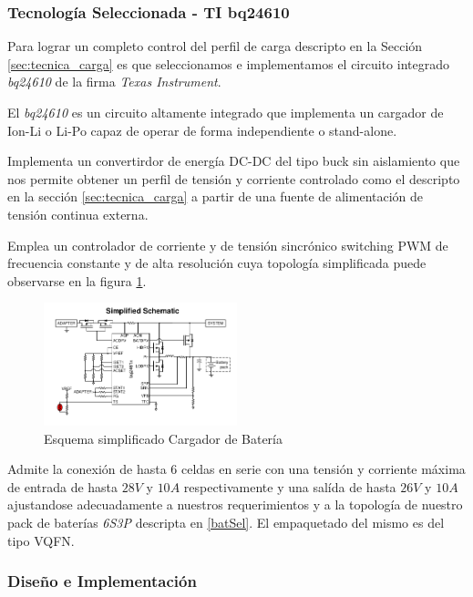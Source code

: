 \documentclass[10pt, a4paper]{article}
\begin{document}
\subsubsection{Tecnología Seleccionada - TI bq24610}

Para lograr un completo control del perfil de carga descripto en la Sección
\ref{sec:tecnica_carga}  es que seleccionamos e implementamos el circuito
integrado \emph{bq24610} de la firma \emph{Texas Instrument}.

El \emph{bq24610} es un circuito altamente integrado que implementa un cargador
de \acrfull{Ion-Li} o \acrfull{Li-Po} capaz de operar de forma independiente o
stand-alone.

Implementa un convertirdor de energía DC-DC del tipo buck sin aislamiento que
nos permite obtener un perfil de tensión y corriente controlado como el
descripto en la sección \ref{sec:tecnica_carga} a partir de una fuente de
alimentación de tensión continua externa.

Emplea un controlador de corriente y de tensión sincrónico
switching PWM de frecuencia constante y de alta resolución cuya
topología simplificada puede observarse en la figura \ref{fig:simp_sch_char}. 

\begin{figure}[h!]
    \centering
    \includegraphics[width=0.5\textwidth]{bat_char/simp_sch_char.png}
    \caption{Esquema simplificado Cargador de Batería}
    \label{fig:simp_sch_char}
\end{figure}
\FloatBarrier

Admite la conexión de hasta 6 celdas en serie con una tensión y
corriente máxima de entrada de hasta $28V$ y $10A$ respectivamente y una salída
de hasta $26V$ y $10A$ ajustandose adecuadamente a nuestros requerimientos y a
la topología de nuestro pack de baterías \emph{6S3P} descripta en \ref{batSel}.
El empaquetado del mismo es del tipo VQFN.

\subsubsection{Diseño e Implementación}
\end{document}
